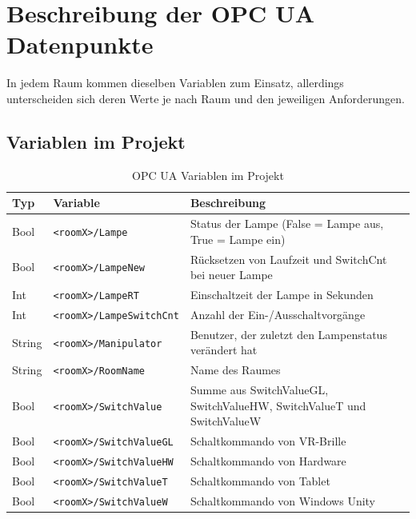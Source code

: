 \clearpage
\newpage

\section{Beschreibung der OPC UA Datenpunkte}

In jedem Raum kommen dieselben Variablen zum Einsatz, allerdings unterscheiden sich deren Werte je nach Raum und den jeweiligen Anforderungen.



\subsection{Variablen im Projekt}

\renewcommand{\arraystretch}{1.3}

\begin{table}[H]
\centering
\begin{tabular}{|p{2cm}|p{5cm}|p{7cm}|}
\hline
\textbf{Typ} & \textbf{Variable} & \textbf{Beschreibung} \\
\hline
Bool & \texttt{<roomX>/Lampe} & Status der Lampe (False = Lampe aus, True = Lampe ein) \\
\hline
Bool & \texttt{<roomX>/LampeNew} & Rücksetzen von Laufzeit und SwitchCnt bei neuer Lampe \\
\hline
Int & \texttt{<roomX>/LampeRT} & Einschaltzeit der Lampe in Sekunden \\
\hline
Int & \texttt{<roomX>/LampeSwitchCnt} & Anzahl der Ein-/Ausschaltvorgänge \\
\hline
String & \texttt{<roomX>/Manipulator} & Benutzer, der zuletzt den Lampenstatus verändert hat \\
\hline
String & \texttt{<roomX>/RoomName} & Name des Raumes \\
\hline
Bool & \texttt{<roomX>/SwitchValue} & Summe aus SwitchValueGL, SwitchValueHW, SwitchValueT und SwitchValueW \\
\hline
Bool & \texttt{<roomX>/SwitchValueGL} & Schaltkommando von VR-Brille \\
\hline
Bool & \texttt{<roomX>/SwitchValueHW} & Schaltkommando von Hardware \\
\hline
Bool & \texttt{<roomX>/SwitchValueT} & Schaltkommando von Tablet \\
\hline
Bool & \texttt{<roomX>/SwitchValueW} & Schaltkommando von Windows Unity \\
\hline
\end{tabular}
\caption{OPC UA Variablen im Projekt}
\end{table}

